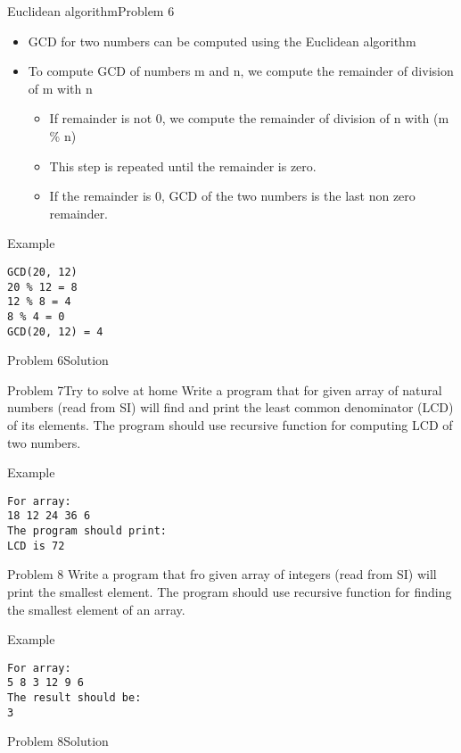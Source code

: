 \begin{frame}[fragile,shrink=5]{Euclidean algorithm}{Problem 6}
\begin{itemize}
  \item GCD for two numbers can be computed using the Euclidean algorithm
  \item To compute GCD of numbers m and n, we compute the remainder of
  division of m with n
  \begin{itemize}
  \item If remainder is not 0, we compute the remainder of division of n with (m
  \% n)
  \item This step is repeated until the remainder is zero.
  \item If the remainder is 0, GCD of the two numbers is the last non zero
  remainder.
  \end{itemize}
\end{itemize}
\begin{exampleblock}{Example}
\begin{verbatim}
GCD(20, 12)
20 % 12 = 8
12 % 8 = 4
8 % 4 = 0
GCD(20, 12) = 4
\end{verbatim}
\end{exampleblock}
\end{frame}

\begin{frame}[fragile]{Problem 6}{Solution}

\end{frame}

\begin{frame}[fragile]{Problem 7}{Try to solve at home}
Write a program that for given array of natural numbers (read from SI) will find
and print the least common denominator (LCD) of its elements. The program should
use recursive function for computing LCD of two numbers.
\begin{exampleblock}{Example}
\begin{verbatim}
For array:
18 12 24 36 6
The program should print:
LCD is 72
\end{verbatim}
\end{exampleblock}
\end{frame}
   

\begin{frame}[fragile]{Problem 8}
Write a program that fro given array of integers (read from SI) will print the
smallest element. The program should use recursive function for finding the
smallest element of an array.
\begin{exampleblock}{Example}
\begin{verbatim}
For array:
5 8 3 12 9 6
The result should be:
3
\end{verbatim}
\end{exampleblock}
\end{frame}

\begin{frame}[fragile]{Problem 8}{Solution}

\end{frame}

